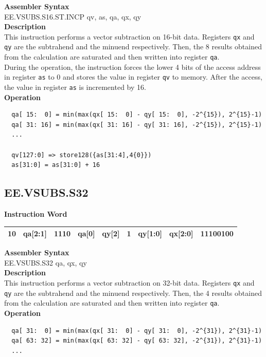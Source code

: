 \textbf{Assembler Syntax} \\
EE.VSUBS.S16.ST.INCP qv, as, qa, qx, qy \\
\textbf{Description} \\
This instruction performs a vector subtraction on 16-bit data. Registers \lstinline{qx} and \lstinline{qy} are the subtrahend and the minuend respectively. Then, the 8 results obtained from the calculation are saturated and then written into register \lstinline{qa}. \\ During the operation, the instruction forces the lower 4 bits of the access address in register \lstinline{as} to 0 and stores the value in register \lstinline{qv} to memory. After the access, the value in register \lstinline{as} is incremented by 16.\\
\textbf{Operation}
\begin{lstlisting}
  qa[ 15:  0] = min(max(qx[ 15:  0] - qy[ 15:  0], -2^{15}), 2^{15}-1)
  qa[ 31: 16] = min(max(qx[ 31: 16] - qy[ 31: 16], -2^{15}), 2^{15}-1)
  ...

  qv[127:0] => store128({as[31:4],4{0}})
  as[31:0] = as[31:0] + 16
\end{lstlisting}

\clearpage
\subsection{EE.VSUBS.S32}\label{instruction:EEVSUBSS32}
\setlength\tabcolsep{6pt}
\textbf{Instruction Word} \\
\begin{tabular}{|c|c|c|c|c|c|c|c|c|}
	\hline
	10 & qa[2:1] & 1110 & qa[0] & qy[2] & 1 & qy[1:0] & qx[2:0] & 11100100 \\
	\hline
\end{tabular}

\textbf{Assembler Syntax} \\
EE.VSUBS.S32 qa, qx, qy \\
\textbf{Description} \\
This instruction performs a vector subtraction on 32-bit data. Registers \lstinline{qx} and \lstinline{qy} are the subtrahend and the minuend respectively. Then, the 4 results obtained from the calculation are saturated and then written into register \lstinline{qa}.\\
\textbf{Operation}
\begin{lstlisting}
  qa[ 31:  0] = min(max(qx[ 31:  0] - qy[ 31:  0], -2^{31}), 2^{31}-1)
  qa[ 63: 32] = min(max(qx[ 63: 32] - qy[ 63: 32], -2^{31}), 2^{31}-1)
  ...
\end{lstlisting}


